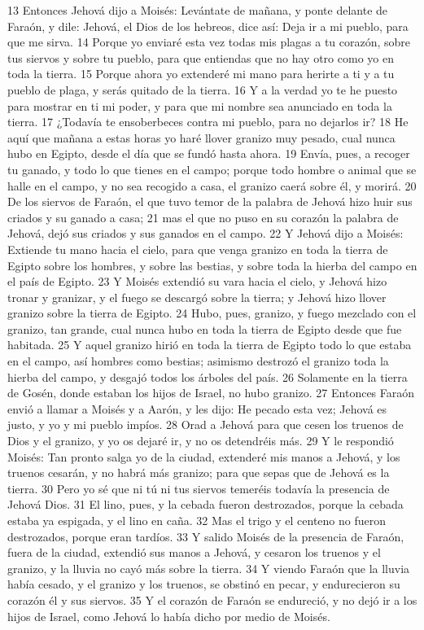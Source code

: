 13 Entonces Jehová dijo a Moisés: Levántate de mañana, y ponte delante de Faraón, y dile: Jehová, el Dios de los hebreos, dice así: Deja ir a mi pueblo, para que me sirva.
14 Porque yo enviaré esta vez todas mis plagas a tu corazón, sobre tus siervos y sobre tu pueblo, para que entiendas que no hay otro como yo en toda la tierra.
15 Porque ahora yo extenderé mi mano para herirte a ti y a tu pueblo de plaga, y serás quitado de la tierra.
16 Y a la verdad yo te he puesto para mostrar en ti mi poder, y para que mi nombre sea anunciado en toda la tierra.
17 ¿Todavía te ensoberbeces contra mi pueblo, para no dejarlos ir?
18 He aquí que mañana a estas horas yo haré llover granizo muy pesado, cual nunca hubo en Egipto, desde el día que se fundó hasta ahora.
19 Envía, pues, a recoger tu ganado, y todo lo que tienes en el campo; porque todo hombre o animal que se halle en el campo, y no sea recogido a casa, el granizo caerá sobre él, y morirá.
20 De los siervos de Faraón, el que tuvo temor de la palabra de Jehová hizo huir sus criados y su ganado a casa;
21 mas el que no puso en su corazón la palabra de Jehová, dejó sus criados y sus ganados en el campo.
22 Y Jehová dijo a Moisés: Extiende tu mano hacia el cielo, para que venga granizo en toda la tierra de Egipto sobre los hombres, y sobre las bestias, y sobre toda la hierba del campo en el país de Egipto.
23 Y Moisés extendió su vara hacia el cielo, y Jehová hizo tronar y granizar, y el fuego se descargó sobre la tierra; y Jehová hizo llover granizo sobre la tierra de Egipto.
24 Hubo, pues, granizo, y fuego mezclado con el granizo, tan grande, cual nunca hubo en toda la tierra de Egipto desde que fue habitada.
25 Y aquel granizo hirió en toda la tierra de Egipto todo lo que estaba en el campo, así hombres como bestias; asimismo destrozó el granizo toda la hierba del campo, y desgajó todos los árboles del país.
26 Solamente en la tierra de Gosén, donde estaban los hijos de Israel, no hubo granizo.
27 Entonces Faraón envió a llamar a Moisés y a Aarón, y les dijo: He pecado esta vez; Jehová es justo, y yo y mi pueblo impíos.
28 Orad a Jehová para que cesen los truenos de Dios y el granizo, y yo os dejaré ir, y no os detendréis más.
29 Y le respondió Moisés: Tan pronto salga yo de la ciudad, extenderé mis manos a Jehová, y los truenos cesarán, y no habrá más granizo; para que sepas que de Jehová es la tierra.
30 Pero yo sé que ni tú ni tus siervos temeréis todavía la presencia de Jehová Dios.
31 El lino, pues, y la cebada fueron destrozados, porque la cebada estaba ya espigada, y el lino en caña.
32 Mas el trigo y el centeno no fueron destrozados, porque eran tardíos.
33 Y salido Moisés de la presencia de Faraón, fuera de la ciudad, extendió sus manos a Jehová, y cesaron los truenos y el granizo, y la lluvia no cayó más sobre la tierra.
34 Y viendo Faraón que la lluvia había cesado, y el granizo y los truenos, se obstinó en pecar, y endurecieron su corazón él y sus siervos.
35 Y el corazón de Faraón se endureció, y no dejó ir a los hijos de Israel, como Jehová lo había dicho por medio de Moisés.

